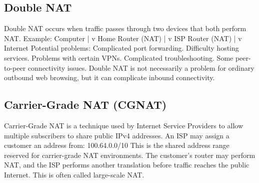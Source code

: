 \subsection{Double NAT}
Double NAT occurs when traffic passes through two devices that both perform NAT.
Example:
Computer | v Home Router (NAT) | v ISP Router (NAT) | v Internet
Potential problems:
Complicated port forwarding.
Difficulty hosting services.
Problems with certain VPNs.
Complicated troubleshooting.
Some peer-to-peer connectivity issues.
Double NAT is not necessarily a problem for ordinary outbound web browsing, but it can complicate inbound connectivity.
\subsection{Carrier-Grade NAT (CGNAT)}
Carrier-Grade NAT is a technique used by Internet Service Providers to allow multiple subscribers to share public IPv4 addresses.
An ISP may assign a customer an address from:
100.64.0.0/10
This is the shared address range reserved for carrier-grade NAT environments.
The customer's router may perform NAT, and the ISP performs another translation before traffic reaches the public Internet.
This is often called large-scale NAT.
